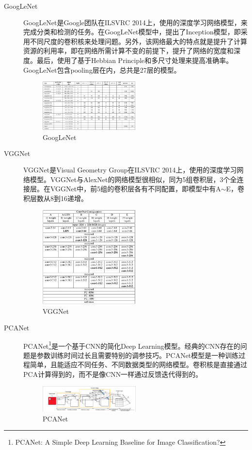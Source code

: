 \documentclass[12pt]{article}
\begin{document}
\begin{description}
\item[GoogLeNet] GoogLeNet\cite{simonyan2014very}是Google团队在ILSVRC 2014上，使用的深度学习网络模型，来完成分类和检测的任务。在GoogLeNet模型中，提出了Inception模型，即采用不同尺度的卷积核来处理问题。另外，该网络最大的特点就是提升了计算资源的利用率，即在网络所需计算不变的前提下，提升了网络的宽度和深度。最后，使用了基于Hebbian Principle和多尺寸处理来提高准确率。GoogLeNet包含pooling层在内，总共是27层的模型。

	
\begin{figure}[!ht]
\centering
\includegraphics[width=0.5\textwidth]{googlenet}
\caption{GoogLeNet}
\end{figure}

\item[VGGNet] VGGNet\cite{szegedy2014going}是Visual Geometry Group在ILSVRC 2014上，使用的深度学习网络模型。VGGNet与AlexNet的网络模型很相似，同为5组卷积层，3个全连接层。在VGGNet中，前5组的卷积层各有不同配置，即模型中有A$\sim$E，卷积层数从8到16递增。%
\begin{figure}[!ht]
\centering
\includegraphics[width=0.5\textwidth]{vggnet2}
\caption{VGGNet}
\end{figure}

\item[PCANet] PCANet\footnote{PCANet: A Simple Deep Learning Baseline for Image Classification?}是一个基于CNN的简化Deep Learning模型。经典的CNN存在的问题是参数训练时间过长且需要特别的调参技巧。PCANet模型是一种训练过程简单，且能适应不同任务、不同数据类型的网络模型。卷积核是直接通过PCA计算得到的，而不是像CNN一样通过反馈迭代得到的。
\begin{figure}[!ht]
\centering
\includegraphics[width=0.5\textwidth]{PCANet}
\caption{PCANet}
\end{figure}


\end{description}
\end{document}
